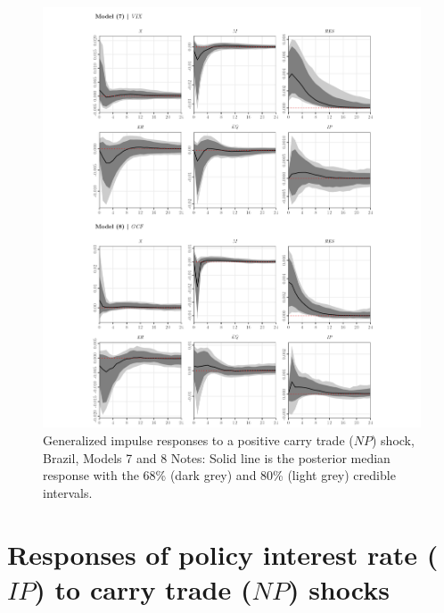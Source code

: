 \documentclass[a4paper, twoside]{templates/ociamthesis}
\begin{document}
\begin{figure}[!ht]

{\centering \includegraphics[width=0.99\columnwidth]{figure/g.MODEL78.NPHIGHER.TARGET.BR} 

}

\caption[Generalized impulse responses to a positive carry trade ($NP$) shock, Brazil, Models 7 and 8]{Generalized impulse responses to a positive carry trade ($NP$) shock, Brazil, Models 7 and 8 \newline \scriptsize Notes: Solid line is the posterior median response with the 68\% (dark grey) and 80\% (light grey) credible intervals.}\label{fig:Figure56}
\end{figure}

\clearpage

\hypertarget{appendixdIR}{%
\section{\texorpdfstring{Responses of policy interest rate (\(IP\)) to carry trade (\(NP\)) shocks}{Responses of policy interest rate (IP) to carry trade (NP) shocks}}\label{appendixdIR}}
\end{document}
